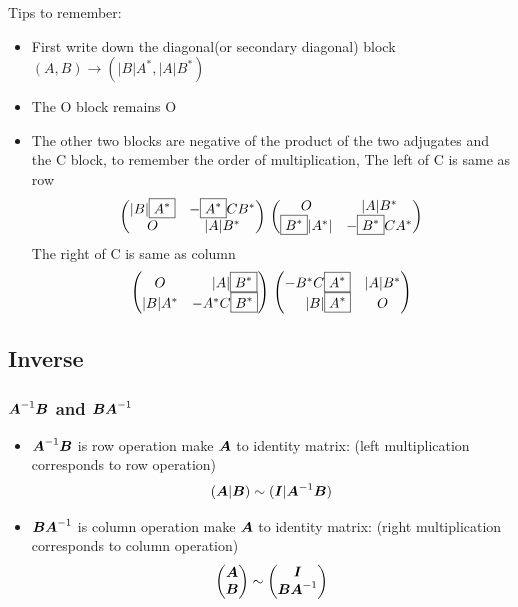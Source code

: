 \documentclass{overview}
\begin{document}
Tips to remember:
\begin{itemize}
	\item First write down the diagonal(or secondary diagonal) block 
		$(A,B)\rightarrow(|B|A^{*},|A|B^{*})$
	\item The O block remains O
	\item The other two blocks are negative of the product of the two
		adjugates and the C block, to remember the order of multiplication,
		\subitem The left of C is same as row
		\[
			\begin{pmatrix} |B|\boxed{A^{*}} & -\boxed{A^{*}}C B^{*} \\
				O & |A|B^{*} \\ \end{pmatrix} \\
			\begin{pmatrix} O & |A|B^{*} \\
				\boxed{B^{*}}|A^{*}| & -\boxed{B^{*}}C A^{*} \\ \end{pmatrix}
		\] 
		\subitem The right of C is same as column
		\[
			\begin{pmatrix} O & \hspace{14pt} |A|\boxed{B^{*}} \\
				|B|A^{*} & -A^{*}C \boxed{B^{*}} \\ \end{pmatrix} \\
				\begin{pmatrix} -B^{*}C \boxed{A^{*}} & |A|B^{*} \\
				\hspace{15pt}|B|\boxed{A^{*}} & O \\ \end{pmatrix}
		\] 
\end{itemize}

\subsection{Inverse}

\subsubsection{$\boldsymbol{A}^{-1}\boldsymbol{B}$ and $\boldsymbol{B}\boldsymbol{A}^{-1}$}

\begin{itemize}
	\item $\boldsymbol{A}^{-1}\boldsymbol{B}$ is row operation make $\boldsymbol{A}$
	to identity matrix: (left multiplication corresponds to row operation)
		\[
			(\boldsymbol{A} | \boldsymbol{B}) \sim
			(\boldsymbol{I} | \boldsymbol{A}^{-1}\boldsymbol{B})
		\] 
	\item $\boldsymbol{B}\boldsymbol{A}^{-1}$ is column operation make $\boldsymbol{A}$
	to identity matrix: (right multiplication corresponds to column operation)
		\[
			\begin{pmatrix}
				\boldsymbol{A} \\
				\boldsymbol{B} \\
			\end{pmatrix} \sim
			\begin{pmatrix}
				\boldsymbol{I} \\
				\boldsymbol{B}\boldsymbol{A}^{-1} \\
			\end{pmatrix}
		\]
\end{itemize}
\end{document}
